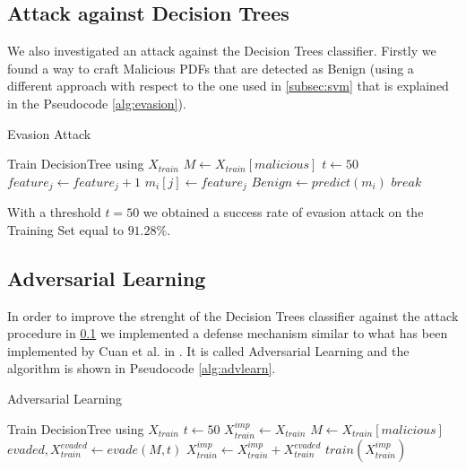 \documentclass[twocolumn, switch]{article} %
\begin{document}
\subsection{Attack against Decision Trees}
\label{subsec:tree}
We also investigated an attack against the Decision Trees classifier. Firstly we found a way to craft Malicious PDFs that are detected as Benign (using a different approach with respect to the one used in \ref{subsec:svm} that is explained in the Pseudocode \ref{alg:evasion}).
\begin{algorithm}
	{\footnotesize
		\caption{Evasion Attack}\label{alg:evasion}
		\begin{algorithmic}
			\Require Train DecisionTree using $X_{train}$
			\State $M \gets X_{train}[malicious]$
			\State $t \gets 50$
			\State $feature_j \gets feature_j + 1$
			\State $m_i[j] \gets feature_j$
			\State $Benign \gets predict(m_i)$
			\State $break$  
			\EndIf
			\EndWhile
			\EndFor
			\EndFor
		\end{algorithmic}
	}
\end{algorithm}

With a threshold $t=50$ we obtained a success rate of evasion attack on the Training Set equal to $91.28\%$.

\subsection{Adversarial Learning}
In order to improve the strenght of the Decision Trees classifier against the attack procedure in \ref{subsec:tree} we implemented a defense mechanism similar to what has been implemented by Cuan et al. in \cite{cuan_damien_delaplace_valois_2018}.
It is called Adversarial Learning and the algorithm is shown in Pseudocode \ref{alg:advlearn}.

\begin{algorithm}
	{\footnotesize
		\caption{Adversarial Learning}\label{alg:advlearn}
		\begin{algorithmic}
			\Require Train DecisionTree using $X_{train}$
			\State $t \gets 50$
			\State $X_{train}^{imp} \gets X_{train}$
			\State $M \gets X_{train}[malicious]$
			\While{$\#PDF evaded > 0$}
			\State $evaded,X_{train}^{evaded} \gets evade(M,t)$
			\If{$evaded$ is $True$}
			\State $X_{train}^{imp} \gets X_{train}^{imp} + X_{train}^{evaded}$
			\EndIf
			\State $train(X_{train}^{imp})$
			\EndWhile
		\end{algorithmic}
	}
\end{algorithm}
\end{document}
